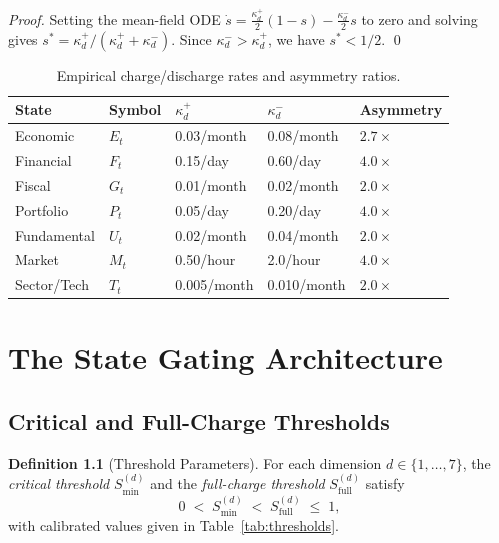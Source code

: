\documentclass[12pt,openany]{book}
\newcommand{\calE}{\mathcal{E}}
\newcommand{\calF}{\mathcal{F}}
\newcommand{\calG}{\mathcal{G}}
\newcommand{\calP}{\mathcal{P}}
\newcommand{\calU}{\mathcal{U}}
\newcommand{\calM}{\mathcal{M}}
\newcommand{\calT}{\mathcal{T}}
\numberwithin{equation}{chapter}
\theoremstyle{plain}
\theoremstyle{definition}
\newtheorem{definition}[theorem]{Definition}
\theoremstyle{remark}
\def\mathcal#1{#1}%
\begin{document}
\begin{proof}
Setting the mean-field ODE
$\dot{s} = \tfrac{\kappa_d^+}{2}(1-s) - \tfrac{\kappa_d^-}{2}s$
to zero and solving gives $s^* = \kappa_d^+ / (\kappa_d^+ +
\kappa_d^-)$.  Since $\kappa_d^- > \kappa_d^+$, we have
$s^* < 1/2$.
\qed
\end{proof}

\begin{table}[H]
\centering
\caption{Empirical charge/discharge rates and asymmetry ratios.}
\label{tab:rates}
\small
\begin{tabularx}{\linewidth}{@{} l l X X X @{}}
\toprule
\textbf{State} & \textbf{Symbol}
  & $\kappa_d^+$ & $\kappa_d^-$ & \textbf{Asymmetry} \\
\midrule
Economic    & $\calE_t$ & 0.03/month & 0.08/month & $2.7\times$ \\
Financial   & $\calF_t$ & 0.15/day   & 0.60/day   & $4.0\times$ \\
Fiscal      & $\calG_t$ & 0.01/month & 0.02/month & $2.0\times$ \\
Portfolio   & $\calP_t$ & 0.05/day   & 0.20/day   & $4.0\times$ \\
Fundamental & $\calU_t$ & 0.02/month & 0.04/month & $2.0\times$ \\
Market      & $\calM_t$ & 0.50/hour  & 2.0/hour   & $4.0\times$ \\
Sector/Tech & $\calT_t$ & 0.005/month& 0.010/month& $2.0\times$ \\
\bottomrule
\end{tabularx}
\end{table}

\chapter{The State Gating Architecture}
\label{ch:gating}

\section{Critical and Full-Charge Thresholds}

\begin{definition}[Threshold Parameters]
\label{def:thresholds}
For each dimension $d \in \{1,\ldots,7\}$, the
\emph{critical threshold} $\mathcal{S}_{\min}^{(d)}$ and the
\emph{full-charge threshold} $\mathcal{S}_{\mathrm{full}}^{(d)}$
satisfy
\begin{equation}
  0 \;<\; \mathcal{S}_{\min}^{(d)}
  \;<\; \mathcal{S}_{\mathrm{full}}^{(d)}
  \;\leq\; 1,
  \label{eq:threshold-ordering}
\end{equation}
with calibrated values given in Table~\ref{tab:thresholds}.
\end{definition}
\end{document}
